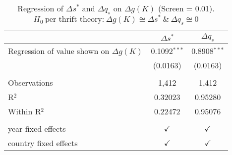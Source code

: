 \begin{table}[pos=h]
\caption{Regression of $\Delta s^*$ and $\Delta q_s$ on $\Delta g(K)$ (Screen = 0.01). $H_0\ \text{per thrift theory:} \ \Delta g(K) \cong \Delta s^* \ \& \ \Delta q_s \cong 0$}
\centering
\begin{tabularx}{\columnwidth}{lcc}
   \toprule
                                               & $\Delta s^*$   & $\Delta q_s$ \\    
   \midrule 
   Regression of value shown on $\Delta g(K)$  & 0.1092$^{***}$ & 0.8908$^{***}$\\   
                                               & (0.0163)       & (0.0163)\\   
    \\
   Observations                                & 1,412          & 1,412\\  
   R$^2$                                       & 0.32023        & 0.95280\\  
   Within R$^2$                                & 0.22472        & 0.95076\\  
    \\
   year fixed effects                          & $\checkmark$   & $\checkmark$\\   
   country fixed effects                       & $\checkmark$   & $\checkmark$\\   
   \bottomrule
\end{tabularx}
   \label{tbl-wid_si_table}
\end{table}